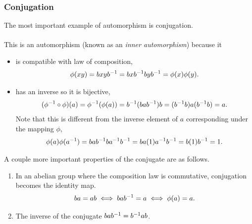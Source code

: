 \documentclass[MathsNotesBase.tex]{subfiles}
\begin{document}
{	\subsubsection{Conjugation}
	The most important example of automorphism is conjugation.\\\\
	This is an automorphism (known as an \textit{inner automorphism}) because it
	\begin{itemize}
		\item{is compatible with law of composition, 
			\[ \phi(xy) = bxy{b}^{-1} = bx{b}^{-1}by{b}^{-1} = \phi(x)\phi(y). \]
		}
		\item{has an inverse so it is bijective, 
			\[ ({\phi}^{-1} \circ \phi)(a) = {\phi}^{-1}(\phi(a)) = {b}^{-1}(ba{b}^{-1})b = ({b}^{-1}b)a({b}^{-1}b) = a. \]
			Note that this is different from the inverse element of $a$ corresponding under the mapping $\phi$,
			\[ \phi(a)\phi({a}^{-1}) = ba{b}^{-1}b{a}^{-1}{b}^{-1} = ba(1){a}^{-1}{b}^{-1} = b(1){b}^{-1} = 1. \]
		}
	\end{itemize}
	A couple more important properties of the conjugate are as follows.
	\begin{enumerate}[label=(\roman*)]
		\item{In an abelian group where the composition law is commutative, conjugation becomes the identity map.
			\[ ba = ab \iff ba{b}^{-1} = a \iff \phi(a) = a. \]}
		\item{The inverse of the conjugate ${ ba{b}^{-1} = {b}^{-1}ab }$.}
	\end{enumerate}
}
\end{document}
